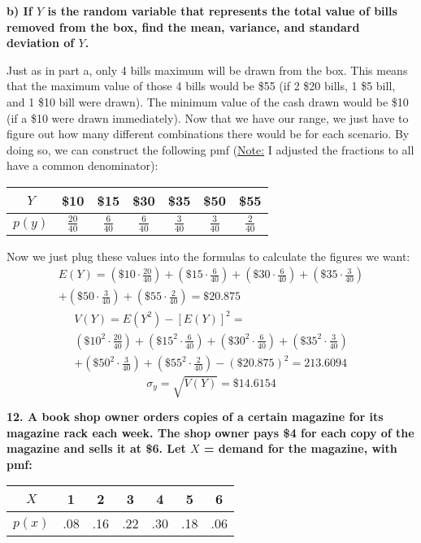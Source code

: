 \documentclass[12pt, letter]{article}
\begin{document}
\qquad \textbf{b) If $Y$ is the random variable that represents the total value of bills removed from the box, find the mean, variance, and standard deviation of $Y$.}
\begin{center}
	Just as in part a, only 4 bills maximum will be drawn from the box. This means that the maximum value of those 4 bills would be \$55 (if 2 \$20 bills, 1 \$5 bill, and 1 \$10 bill were drawn). The minimum value of the cash drawn would be \$10 (if a \$10 were drawn immediately). Now that we have our range, we just have to figure out how many different combinations there would be for each scenario. By doing so, we can construct the following pmf (\underline{Note:} I adjusted the fractions to all have a common denominator):
	\linebreak
	\linebreak
	\def\arraystretch{1.5}
	\begin{tabular}{|c|c|c|c|c|c|c|}
		\hline
		$Y$ & \$10 & \$15 & \$30 & \$35 & \$50 & \$55 \\
		\hline
		$p(y)$ & $\frac{20}{40}$ & $\frac{6}{40}$ & $\frac{6}{40}$ & $\frac{3}{40}$ & $\frac{3}{40}$ & $\frac{2}{40}$ \\
		\hline
	\end{tabular}
	\linebreak
	\linebreak
	Now we just plug these values into the formulas to calculate the figures we want:
	\begin{multline*}
	E(Y)=\left(\$10 \cdot \frac{20}{40}\right)+\left(\$15 \cdot \frac{6}{40}\right)+\left(\$30 \cdot \frac{6}{40}\right)+\left(\$35 \cdot \frac{3}{40}\right) \\
	+\left(\$50 \cdot \frac{3}{40}\right)+\left(\$55 \cdot \frac{2}{40}\right)=\boxed{\$20.875}
	\end{multline*}
	\begin{multline*}
		V(Y)=E(Y^{2})-[E(Y)]^{2}= \\
		\left(\$10^{2} \cdot \frac{20}{40}\right)+\left(\$15^{2} \cdot \frac{6}{40}\right)+\left(\$30^{2} \cdot \frac{6}{40}\right)+\left(\$35^{2} \cdot \frac{3}{40}\right) \\
	+\left(\$50^{2} \cdot \frac{3}{40}\right)+\left(\$55^{2} \cdot \frac{2}{40}\right)-(\$20.875)^{2}=\boxed{213.6094}
	\end{multline*}
	$$\sigma_{y}=\sqrt{V(Y)}=\boxed{\$14.6154}$$
\end{center}

\textbf{12. A book shop owner orders copies of a certain magazine for its magazine rack 
each week. The shop owner pays \$4 for each copy of the magazine and sells it at \$6. Let $X$ = demand for the magazine, with pmf:}
\begin{center}
	\begin{tabular}{|c|c|c|c|c|c|c|}
		\hline
		$X$ & 1 & 2 & 3 & 4 & 5 & 6 \\
		\hline
		$p(x)$ & .08 & .16 & .22 & .30 & .18 & .06 \\
		\hline
	\end{tabular}
\end{center}
\end{document}

